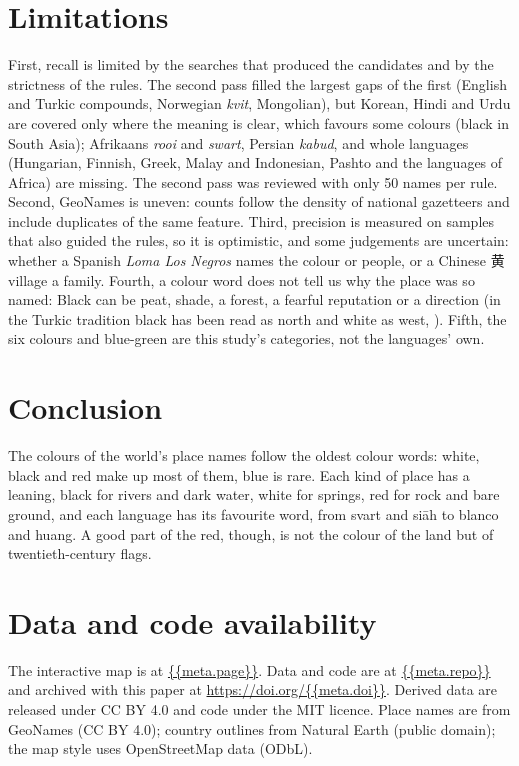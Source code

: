 \documentclass[11pt,a4paper]{article}
\begin{document}
\section{Limitations}
First, recall is limited by the searches that produced the candidates and by the strictness of the rules. The second pass filled the largest gaps of the first (English and Turkic compounds, Norwegian \textit{kvit}, Mongolian), but Korean, Hindi and Urdu are covered only where the meaning is clear, which favours some colours (black in South Asia); Afrikaans \textit{rooi} and \textit{swart}, Persian \textit{kabud}, and whole languages (Hungarian, Finnish, Greek, Malay and Indonesian, Pashto and the languages of Africa) are missing. The second pass was reviewed with only 50 names per rule. Second, GeoNames is uneven: counts follow the density of national gazetteers and include duplicates of the same feature. Third, precision is measured on samples that also guided the rules, so it is optimistic, and some judgements are uncertain: whether a Spanish \textit{Loma Los Negros} names the colour or people, or a Chinese {\cjk 黄} village a family. Fourth, a colour word does not tell us why the place was so named: Black can be peat, shade, a forest, a fearful reputation or a direction (in the Turkic tradition black has been read as north and white as west, \citealp{wikiblacksea}). Fifth, the six colours and blue-green are this study's categories, not the languages' own.

\section{Conclusion}
The colours of the world's place names follow the oldest colour words: white, black and red make up most of them, blue is rare. Each kind of place has a leaning, black for rivers and dark water, white for springs, red for rock and bare ground, and each language has its favourite word, from svart and siāh to blanco and huang. A good part of the red, though, is not the colour of the land but of twentieth-century flags.

\section*{Data and code availability}
The interactive map is at \url{{{meta.page}}}. Data and code are at \url{{{meta.repo}}} and archived with this paper at \url{https://doi.org/{{meta.doi}}}. Derived data are released under CC BY 4.0 and code under the MIT licence. Place names are from GeoNames (CC BY 4.0); country outlines from Natural Earth (public domain); the map style uses OpenStreetMap data (ODbL).
\end{document}
